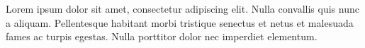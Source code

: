 \documentclass{book}
\begin{document}
Lorem ipsum dolor sit amet, consectetur adipiscing elit.
Nulla convallis quis nunc a aliquam. Pellentesque habitant
morbi tristique senectus et netus et malesuada fames ac
turpis egestas. Nulla porttitor dolor nec imperdiet elementum.

\end{document}
